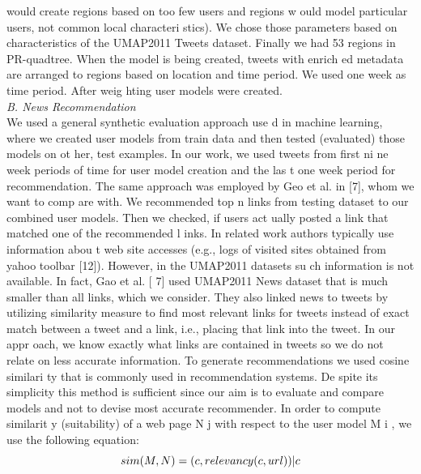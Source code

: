 \documentclass[conference]{IEEEtran}
\begin{document}
would 
create  regions  based  on  too  few  users  and  regions  w
ould 
model  particular  users,  not  common  local  characteri
stics). 
We  chose  those  parameters  based  on  characteristics 
of  the 
UMAP2011  Tweets  dataset.  Finally  we  had  53  regions 
in 
PR-quadtree. When  the  model  is  being  created,  tweets  with  enrich
ed 
metadata are arranged to regions based on location 
and time 
period.  We  used  one  week  as  time  period.  After  weig
hting 
user models were created. \\
\textit{B.   News Recommendation}\\
We used a general synthetic evaluation approach use
d in 
machine  learning,  where  we  created  user  models  from
  train 
data  and  then  tested  (evaluated)  those  models  on  ot
her,  test 
examples. In our work, we used tweets from first ni
ne week 
periods of time for user model creation and the las
t one week 
period   for   recommendation.   The   same   approach   was 
employed  by  Geo  et  al.  in  [7],  whom  we  want  to  comp
are 
with. 
We recommended  top 
n
  links from  testing dataset  to  our 
combined  user  models.  Then  we  checked,  if  users  act
ually 
posted a link that matched one of the recommended l
inks. In 
related work authors typically use information abou
t web site 
accesses  (e.g.,  logs  of  visited  sites  obtained  from
  yahoo 
toolbar  [12]).  However,  in  the  UMAP2011  datasets  su
ch 
information  is  not  available.  In  fact,  Gao  et  al.  [
7]  used 
UMAP2011 News dataset that is much smaller than all
 links, 
which  we  consider.  They  also  linked  news  to  tweets 
by 
utilizing  similarity  measure  to  find  most  relevant 
links  for 
tweets  instead  of  exact  match  between  a  tweet  and  a
  link, 
i.e.,  placing  that  link  into  the  tweet.  In  our  appr
oach,  we 
know exactly what links are contained in tweets so 
we do not 
relate on less accurate information. 
To  generate  recommendations  we  used  cosine  similari
ty 
that  is  commonly  used  in  recommendation  systems.  De
spite 
its  simplicity  this  method  is  sufficient  since  our 
aim  is  to 
evaluate   and   compare   models   and   not   to   devise   most 
accurate   recommender.   In   order   to   compute   similarit
y 
(suitability)  of  a  web page 
N
j
 with  respect to the  user  model 
M
i
, we use the following equation: 
\begin{equation}
sim(M,N)={(c,relevancy(c,url))|c}
\index{id5}
\end{equation}
\\
\end{document}
